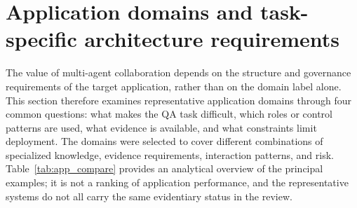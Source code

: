 \documentclass[a4paper,fleqn]{cas-dc}
\begin{document}
\iffalse
\section{Application domains and task-specific architecture requirements}
\label{sec:applications}

The value of multi-agent collaboration depends on the structure and
governance requirements of the target application, rather than on the domain
label alone. This section therefore examines representative application
domains through four common questions: what makes the QA task difficult, which
roles or control patterns are used, what evidence is available, and what
constraints limit deployment. The domains were selected to cover different
combinations of specialized knowledge, evidence requirements, interaction
patterns, and risk. Table~\ref{tab:app_compare} provides an analytical
overview of the principal examples; it is not a ranking of application
performance, and the representative systems do not all carry the same
evidentiary status in the review.
\end{document}
